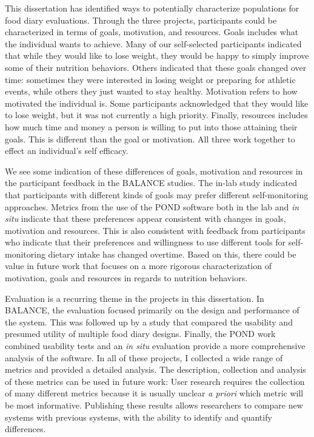 This dissertation has identified ways to potentially characterize populations for food diary evaluations. Through the three projects, participants could be characterized in terms of goals, motivation, and resources. Goals includes what the individual wants to achieve. Many of our self-selected participants indicated that while they would like to lose weight, they would be happy to simply improve some of their nutrition behaviors. Others indicated that these goals changed over time: sometimes they were interested in losing weight or preparing for athletic events, while others they just wanted to stay healthy.   Motivation refers to how motivated the individual is. Some participants acknowledged that they would like to lose weight, but it was not currently a high priority. Finally, resources includes how much time and money a person is willing to put into those attaining their goals. This is different than the goal or motivation. All three work together to effect an individual's self efficacy. 

We see some indication of these differences of goals, motivation and resources in the participant feedback in the BALANCE studies. The in-lab study indicated that participants with different kinds of goals may prefer different self-monitoring approaches. Metrics from the use of the POND software both in the lab and \textit{in situ} indicate that these preferences appear consistent with changes in goals, motivation and resources. This is also consistent with feedback from participants who indicate that their preferences and willingness to use different tools for self-monitoring dietary intake has changed overtime. Based on this, there could be value in future work that focuses on a more rigorous characterization of motivation, goals and resources in regards to nutrition behaviors. 


Evaluation is a recurring theme in the projects in this dissertation. In BALANCE, the evaluation focused primarily on the design and performance of the system. This was followed up by a study that compared the usability and presumed utility of multiple food diary designs. Finally, the POND work combined usability tests and an \textit{in situ} evaluation provide a more comprehensive analysis of the software. In all of these projects, I collected a wide range of metrics and provided a detailed analysis. The description, collection and analysis of these metrics can be used in future work: User research requires the collection of many different metrics because it is usually unclear \textit{a priori} which metric will be most informative. Publishing these results allows researchers to compare new systems with previous systems, with the ability to identify and quantify differences. 


